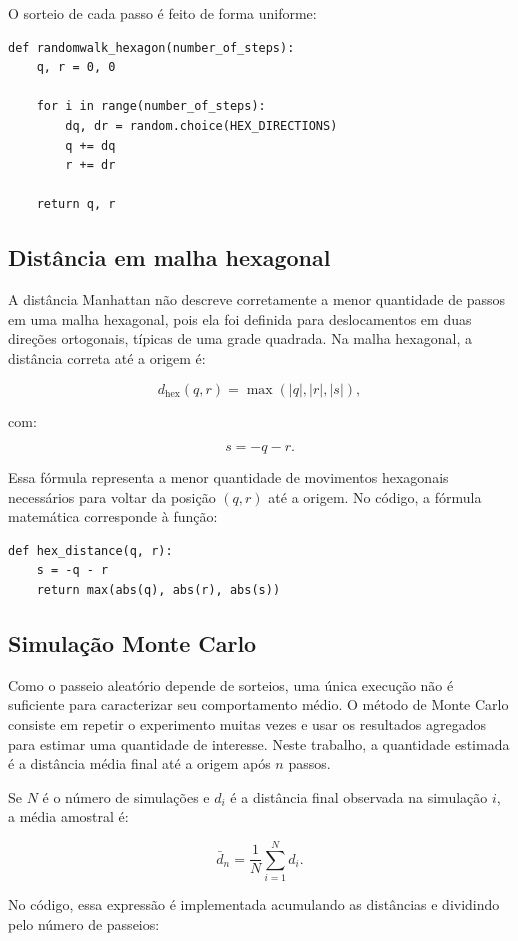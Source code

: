 \documentclass[12pt,a4paper]{article}
\begin{document}
O sorteio de cada passo é feito de forma uniforme:

\begin{lstlisting}
def randomwalk_hexagon(number_of_steps):
    q, r = 0, 0

    for i in range(number_of_steps):
        dq, dr = random.choice(HEX_DIRECTIONS)
        q += dq
        r += dr

    return q, r
\end{lstlisting}

\subsection{Distância em malha hexagonal}

A distância Manhattan não descreve corretamente a menor quantidade de passos em uma malha hexagonal, pois ela foi definida para deslocamentos em duas direções ortogonais, típicas de uma grade quadrada. Na malha hexagonal, a distância correta até a origem é:

\[
d_{\mathrm{hex}}(q,r)=\max(|q|,|r|,|s|),
\]

com:

\[
s=-q-r.
\]

Essa fórmula representa a menor quantidade de movimentos hexagonais necessários para voltar da posição $(q,r)$ até a origem. No código, a fórmula matemática corresponde à função:

\begin{lstlisting}
def hex_distance(q, r):
    s = -q - r
    return max(abs(q), abs(r), abs(s))
\end{lstlisting}

\subsection{Simulação Monte Carlo}

Como o passeio aleatório depende de sorteios, uma única execução não é suficiente para caracterizar seu comportamento médio. O método de Monte Carlo consiste em repetir o experimento muitas vezes e usar os resultados agregados para estimar uma quantidade de interesse. Neste trabalho, a quantidade estimada é a distância média final até a origem após $n$ passos.

Se $N$ é o número de simulações e $d_i$ é a distância final observada na simulação $i$, a média amostral é:

\[
\bar{d}_n=\frac{1}{N}\sum_{i=1}^{N}d_i.
\]

No código, essa expressão é implementada acumulando as distâncias e dividindo pelo número de passeios:
\end{document}
